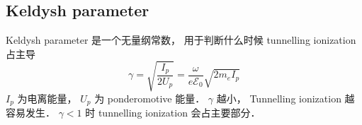 
\begin{issues}
\issueDraft
\end{issues}


\subsection{Keldysh parameter}
Keldysh parameter 是一个无量纲常数， 用于判断什么时候 tunnelling ionization 占主导
\begin{equation}
\gamma = \sqrt{\frac{I_p}{2U_p}} = \frac{\omega}{e\mathcal E_0} \sqrt{2m_e I_p}
\end{equation}
$I_p$ 为电离能量， $U_p$ 为 ponderomotive 能量． $\gamma$ 越小， Tunnelling ionization 越容易发生． $\gamma < 1$ 时 tunnelling ionization 会占主要部分．
